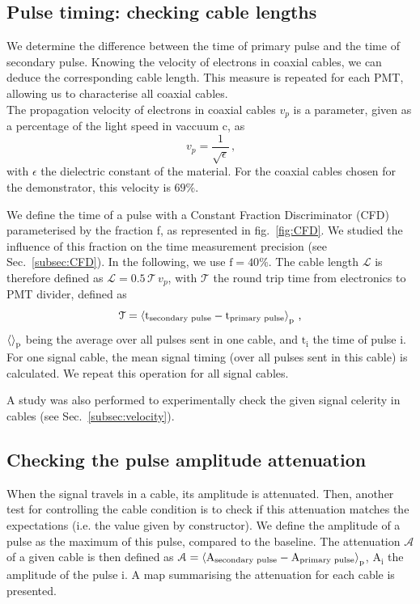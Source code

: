 \subsection*{Pulse timing: checking cable lengths}
\label{subsec:timing}

We determine the difference between the time of primary pulse and the time of secondary pulse.
Knowing the velocity of electrons in coaxial cables, we can deduce the corresponding cable length.
This measure is repeated for each PMT, allowing us to characterise all coaxial cables.\\
The propagation velocity of electrons in coaxial cables $v_{p}$ is a parameter, given as a percentage of the light speed in vaccuum c, as
\begin{equation*}
  v_{p}=\frac{1}{\sqrt{\epsilon}}\,\text{,}
\end{equation*}
with $\epsilon$ the dielectric constant of the material.
For the coaxial cables chosen for the demonstrator, this velocity is $69\%$.

We define the time of a pulse with a Constant Fraction Discriminator (CFD) parameterised by the fraction f, as represented in fig.~\ref{fig:CFD}.
We studied the influence of this fraction on the time measurement precision (see Sec.~\ref{subsec:CFD}).
In the following, we use $\text{f} = 40\%$.
The cable length $\mathcal{L}$ is therefore defined as $\mathcal{L}= 0.5\,\mathcal{T}\,v_{p}$, with $\mathcal{T}$ the round trip time from electronics to PMT divider, defined as
\begin{equation}
\mathcal{T} = \braket{\text{t}_{\text{secondary pulse}}-\text{t}_{\text{primary pulse}}}_{\text{p}} \, \text{,}
\end{equation}
 $\braket{}_{\text{p}}$ being the average over all pulses sent in one cable, and $\text{t}_{\text{i}}$ the time of pulse i.
For one signal cable, the mean signal timing (over all pulses sent in this cable) is calculated.
We repeat this operation for all signal cables.

A study was also performed to experimentally check the given signal celerity in cables (see Sec.~\ref{subsec:velocity}).


\subsection*{Checking the pulse amplitude attenuation}
When the signal travels in a cable, its amplitude is attenuated.
Then, another test for controlling the cable condition is to check if this attenuation matches the expectations (i.e. the value given by constructor).
We define the amplitude of a pulse as the maximum of this pulse, compared to the baseline.
The attenuation $\mathcal{A}$ of a given cable is then defined as $\mathcal{A}=\braket{\text{A}_{ \text{secondary pulse}}-\text{A}_{ \text{primary pulse}}}_{\text{p}}$, $\text{A}_{\text{i}}$ the amplitude of the pulse i.
A map summarising the attenuation for each cable is presented.

